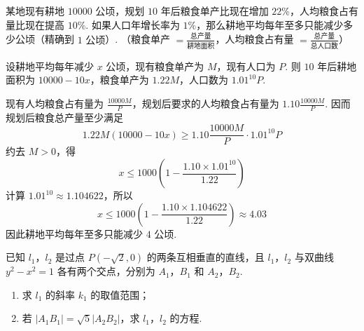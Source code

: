\begin{problem}
某地现有耕地 \(10000\text{ 公顷}\)，规划 \(10\) 年后粮食单产比现在增加 \(22\%\)，人均粮食占有量比现在提高 \(10\%\). 如果人口年增长率为 \(1\%\)，那么耕地平均每年至多只能减少多少公顷（精确到 \(1\text{ 公顷}\)）. （粮食单产 \(=\frac{\text{总产量}}{\text{耕地面积}}\)，人均粮食占有量 \(=\frac{\text{总产量}}{\text{总人口数}}\)）
\end{problem}

\begin{solution}
设耕地平均每年减少 \(x\) 公顷，现有粮食单产为 \(M\)，现有人口为 \(P\). 则 \(10\) 年后耕地面积为 \(10000-10x\)，粮食单产为 \(1.22M\)，人口数为 \(1.01^{10}P\).

现有人均粮食占有量为 \(\frac{10000M}{P}\)，规划后要求的人均粮食占有量为 \(1.10\frac{10000M}{P}\). 因而规划后粮食总产量至少满足
\[
1.22M(10000-10x)
\geqslant
1.10\frac{10000M}{P}\cdot1.01^{10}P
\]
约去 \(M>0\)，得
\[
x\leqslant1000\left(1-\frac{1.10\times1.01^{10}}{1.22}\right)
\]
计算 \(1.01^{10}\approx1.104622\)，所以
\[
x\leqslant1000\left(1-\frac{1.10\times1.104622}{1.22}\right)
\approx4.03
\]
因此耕地平均每年至多只能减少 \(4\) 公顷.
\end{solution}

\begin{problem}
已知 \(l_{1}\)，\(l_{2}\) 是过点 \(P(-\sqrt{2},0)\) 的两条互相垂直的直线，且 \(l_{1}\)，\(l_{2}\) 与双曲线 \(y^{2} - x^{2} = 1\) 各有两个交点，分别为 \(A_{1}\)，\(B_{1}\) 和 \(A_{2}\)，\(B_{2}\).

\begin{enumerate}
\item 求 \(l_{1}\) 的斜率 \(k_{1}\) 的取值范围；
\item 若 \(\left|A_{1}B_{1}\right|=\sqrt{5}\left|A_{2}B_{2}\right|\)，求 \(l_{1}\)，\(l_{2}\) 的方程.
\end{enumerate}
\end{problem}

